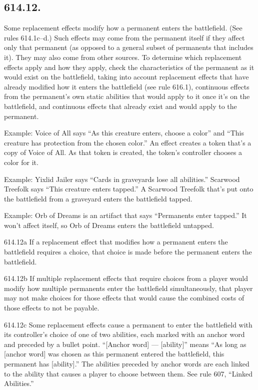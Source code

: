 \subsection*{614.12.}
Some replacement effects modify how a permanent enters the battlefield. (See rules 614.1c–d.) Such effects may come from the permanent itself if they affect only that permanent (as opposed to a general subset of permanents that includes it). They may also come from other sources. To determine which replacement effects apply and how they apply, check the characteristics of the permanent as it would exist on the battlefield, taking into account replacement effects that have already modified how it enters the battlefield (see rule 616.1), continuous effects from the permanent’s own static abilities that would apply to it once it’s on the battlefield, and continuous effects that already exist and would apply to the permanent.

Example: Voice of All says “As this creature enters, choose a color” and “This creature has protection from the chosen color.” An effect creates a token that’s a copy of Voice of All. As that token is created, the token’s controller chooses a color for it.

Example: Yixlid Jailer says “Cards in graveyards lose all abilities.” Scarwood Treefolk says “This creature enters tapped.” A Scarwood Treefolk that’s put onto the battlefield from a graveyard enters the battlefield tapped.

Example: Orb of Dreams is an artifact that says “Permanents enter tapped.” It won’t affect itself, so Orb of Dreams enters the battlefield untapped.

614.12a If a replacement effect that modifies how a permanent enters the battlefield requires a choice, that choice is made before the permanent enters the battlefield.

614.12b If multiple replacement effects that require choices from a player would modify how multiple permanents enter the battlefield simultaneously, that player may not make choices for those effects that would cause the combined costs of those effects to not be payable.

614.12c Some replacement effects cause a permanent to enter the battlefield with its controller’s choice of one of two abilities, each marked with an anchor word and preceded by a bullet point. “[Anchor word] — [ability]” means “As long as [anchor word] was chosen as this permanent entered the battlefield, this permanent has [ability].” The abilities preceded by anchor words are each linked to the ability that causes a player to choose between them. See rule 607, “Linked Abilities.”

